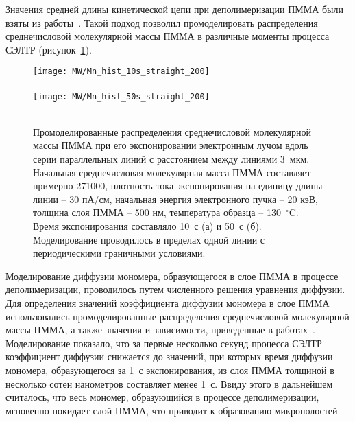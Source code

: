 Значения средней длины кинетической цепи при деполимеризации ПММА были взяты из работы~\cite{Mita_PMMA_zip_lengths_T}.
Такой подход позволил промоделировать распределения среднечисловой молекулярной массы \linebreak ПММА в различные моменты процесса СЭЛТР (рисунок~\ref{fig:Mn_hist}).
\begin{figure}[t]
	\begin{center}
		\texttt{[image: MW/Mn\_hist\_10s\_straight\_200]} \\
		\vspace{-3.7em}  \vspace{2.7em} \\
		\texttt{[image: MW/Mn\_hist\_50s\_straight\_200]} \\
		\vspace{-3.7em}  \vspace{3.7em} \\
	\end{center}
	\vspace{-2.5em}
	\caption{Промоделированные распределения среднечисловой молекулярной массы ПММА при его экспонировании электронным лучом вдоль серии параллельных линий с расстоянием между линиями 3~мкм. Начальная среднечисловая молекулярная масса ПММА составляет примерно 271000, плотность тока экспонирования на единицу длины линии -- 30 пА/см, начальная энергия электронного пучка -- 20 кэВ, толщина слоя ПММА -- 500 нм, температура образца -- 130~$^\circ$C. Время экспонирования составляло 10~с (а) и 50~с (б). Моделирование проводилось в пределах одной линии с периодическими граничными условиями.}
	\label{fig:Mn_hist}
\end{figure}

Моделирование диффузии мономера, образующегося в слое ПММА в процессе деполимеризации, проводилось путем численного решения уравнения диффузии.
Для определения значений коэффициента диффузии мономера в слое ПММА использовались промоделированные распределения среднечисловой молекулярной массы \linebreak ПММА, а также значения и зависимости, приведенные в работах~\cite{Fragala_3_diffusion, Berens_diffusion_Mn}.
Моделирование показало, что за первые несколько секунд процесса СЭЛТР коэффициент диффузии снижается до значений, при которых время диффузии мономера, образующегося за 1~с экспонирования, из слоя ПММА толщиной в несколько сотен нанометров составляет менее 1~с.
Ввиду этого в дальнейшем считалось, что весь мономер, образующийся в процессе деполимеризации, мгновенно покидает слой ПММА, что приводит к образованию микрополостей.

